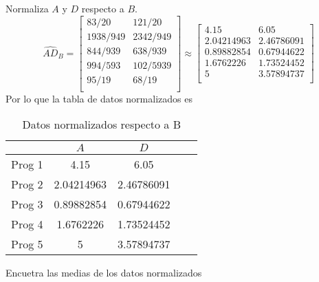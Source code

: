 \documentclass[]{article}
\begin{document}
    Normaliza $A$ y $D$ respecto a $B$.
    \[\hat{AD}_{B} = 
    \begin{bmatrix}
        83 / 20 & 121 / 20 \\
        1938 / 949 & 2342 / 949 \\
        844 / 939 & 638 / 939 \\
        994 / 593 & 102 / 5939 \\
        95 / 19 & 68 / 19 \\ 
    \end{bmatrix}
    \approx 
    \begin{bmatrix}
        4.15 & 6.05 \\
        2.04214963 & 2.46786091 \\
        0.89882854 & 0.67944622 \\
        1.6762226 & 1.73524452 \\
        5 & 3.57894737 \\
    \end{bmatrix}
    \]
    Por lo que la tabla de datos normalizados es
    \begin{table}[H]
        \centering
        \caption{Datos normalizados respecto a B}
        \begin{tabular}{|c|c|c|c|c|}
            \hline
             & $A$ & $D$ \\
            \hline
            Prog 1 & 4.15 & 6.05 \\
            Prog 2 & 2.04214963 & 2.46786091 \\
            Prog 3 & 0.89882854 & 0.67944622 \\
            Prog 4 & 1.6762226 & 1.73524452 \\
            Prog 5 & 5 & 3.57894737 \\
            \hline
        \end{tabular}
    \end{table}

    Encuetra las medias de los datos normalizados
\end{document}
